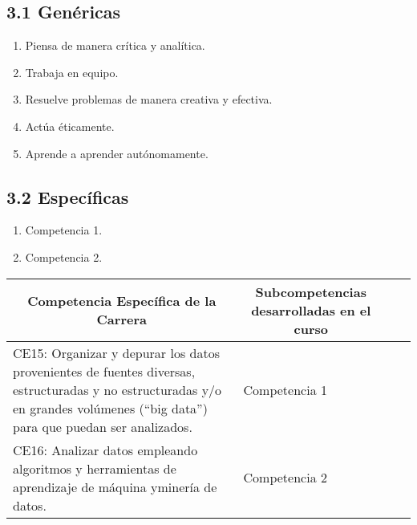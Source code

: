 
\subsection*{3.1 Genéricas}
\begin{enumerate}[label=\Alph*.]
    \item Piensa de manera crítica y analítica.
    \item Trabaja en equipo.
    \item Resuelve problemas de manera creativa y efectiva.
    \item Actúa éticamente.
    \item Aprende a aprender autónomamente.
\end{enumerate}

\subsection*{3.2 Específicas}
\begin{enumerate}[label=\Alph*.]
    \item Competencia 1.
    \item Competencia 2.
\end{enumerate}

\begin{table}[h!]
    \centering
    \setlength{\extrarowheight}{5pt}
    \begin{tabularx}{\textwidth}{|X|X|X|X|}
        \hline
         \multicolumn{1}{|c|}{\textbf{Competencia Específica de la Carrera}} & 
         \multicolumn{1}{c|}{\textbf{Subcompetencias desarrolladas en el curso}} \\ \hline 
         CE15: Organizar y depurar los datos provenientes de fuentes diversas, estructuradas y no estructuradas y/o en grandes volúmenes (“big data”) para que puedan ser analizados.& Competencia 1 \\ \hline 
         CE16: Analizar datos empleando algoritmos y herramientas de aprendizaje de máquina yminería de datos.& Competencia 2 \\ \hline 
    \end{tabularx}
\end{table}

\newpage
{}

